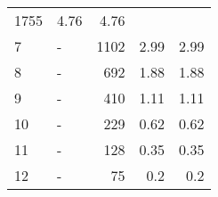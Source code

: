 \begin{longtable}{lXrrr}
       \num{1755} &
       \num[round-mode=places,round-precision=2]{4.76} &
         \num[round-mode=places,round-precision=2]{4.76} \\

     7 &
     \multicolumn{1}{X}{ -  } &


       \num{1102} &
       \num[round-mode=places,round-precision=2]{2.99} &
         \num[round-mode=places,round-precision=2]{2.99} \\

     8 &
     \multicolumn{1}{X}{ -  } &


       \num{692} &
       \num[round-mode=places,round-precision=2]{1.88} &
         \num[round-mode=places,round-precision=2]{1.88} \\

     9 &
     \multicolumn{1}{X}{ -  } &


       \num{410} &
       \num[round-mode=places,round-precision=2]{1.11} &
         \num[round-mode=places,round-precision=2]{1.11} \\

     10 &
     \multicolumn{1}{X}{ -  } &


       \num{229} &
       \num[round-mode=places,round-precision=2]{0.62} &
         \num[round-mode=places,round-precision=2]{0.62} \\

     11 &
     \multicolumn{1}{X}{ -  } &


       \num{128} &
       \num[round-mode=places,round-precision=2]{0.35} &
         \num[round-mode=places,round-precision=2]{0.35} \\

     12 &
     \multicolumn{1}{X}{ -  } &


       \num{75} &
       \num[round-mode=places,round-precision=2]{0.2} &
         \num[round-mode=places,round-precision=2]{0.2} \\


\end{longtable}
